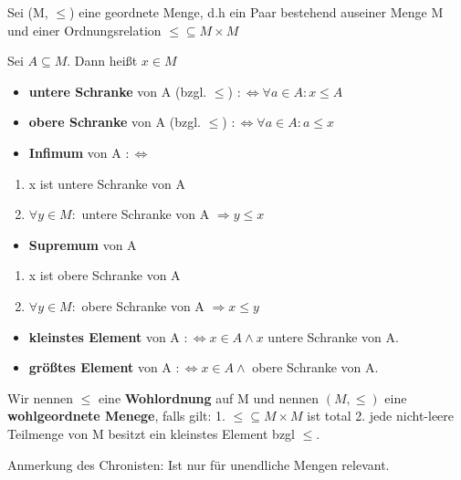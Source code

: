 \documentclass{../../meta/tudscript}
\begin{document}
Sei (M, \(\leq\)) eine geordnete Menge, d.h ein Paar bestehend auseiner
Menge M und einer Ordnungsrelation \(\leq \subseteq M \times M\)

Sei \(A \subseteq M\). Dann heißt \(x \in M\)

\begin{itemize}
\item
  \textbf{untere Schranke} von A (bzgl. \(\leq\))
  \(: \iff \forall a \in A: x \leq A\)
\item
  \textbf{obere Schranke} von A (bzgl. \(\leq\))
  \(: \iff \forall a \in A: a \leq x\)
\item
  \textbf{Infimum} von A \(: \iff\)
\end{itemize}

\begin{enumerate}
\def\labelenumi{\arabic{enumi}.}

\item
  x ist untere Schranke von A
\item
  \(\forall y \in M:\) untere Schranke von A \(\Rightarrow y \leq x\)
\end{enumerate}

\begin{itemize}

\item
  \textbf{Supremum} von A
\end{itemize}

\begin{enumerate}
\def\labelenumi{\arabic{enumi}.}

\item
  x ist obere Schranke von A
\item
  \(\forall y \in M:\) obere Schranke von A \(\Rightarrow x \leq y\)
\end{enumerate}

\begin{itemize}
\item
  \textbf{kleinstes Element} von A \(: \iff x \in A \land x\) untere
  Schranke von A.
\item
  \textbf{größtes Element} von A \(: \iff x \in A \land\) obere Schranke
  von A.
\end{itemize}

Wir nennen \(\leq\) eine \textbf{Wohlordnung} auf M und nennen
\((M, \leq)\) eine \textbf{wohlgeordnete Menege}, falls gilt: 1.
\(\leq \subseteq M \times M\) ist total 2. jede nicht-leere Teilmenge
von M besitzt ein kleinstes Element bzgl \(\leq\).

Anmerkung des Chronisten: Ist nur für unendliche Mengen relevant.
\end{document}

